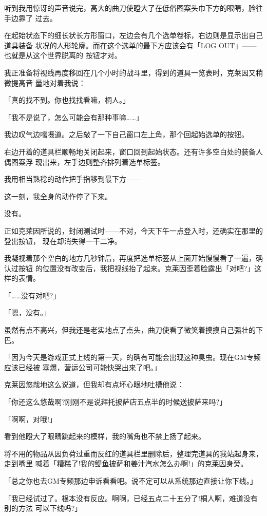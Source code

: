 \documentclass[11pt]{book}
\begin{document}
听到我用惊讶的声音说完，高大的曲刀使瞪大了在低俗图案头巾下方的眼睛，脸往手边靠了
过去。

在起始状态下的细长状长方形窗口，左边会有几个选单卷标，右边则是显示出自己道具装备
状况的人形轮廓。而在这个选单的最下方应该会有「LOG OUT」——也就是从这个世界脱离的
按钮才对。

我正准备将视线再度移回在几个小时的战斗里，得到的道具一览表时，克莱因又稍微提高音
量地对着我说：

「真的找不到。你也找找看嘛，桐人。」

「我不是说了，怎么可能会有那种事嘛……」

我边叹气边嚅嗫道。之后敲了一下自己窗口左上角，那个回起始选单的按钮。

右边开着的道具栏顺畅地关闭起来，窗口回到起始状态。还有许多空白处的装备人偶图案浮
现出来，左手边则整齐排列着选单标签。

我用相当熟稔的动作把手指移到最下方——

这一刻，我全身的动作停了下来。

没有。

正如克莱因所说的，封闭测试时——不对，今天下午一点登入时，还确实在那里的登出按钮，
现在却消失得一干二净。

我凝视着那个空白的地方几秒钟后，再度把选单标签从上面开始慢慢看了一遍，确认过按钮
的位置没有改变后，我把视线抬了起来。克莱因歪着脸露出「对吧?」这样的表情。

「……没有对吧?」

「嗯，没有。」

虽然有点不高兴，但我还是老实地点了点头，曲刀使看了微笑着摸摸自己强壮的下巴。

「因为今天是游戏正式上线的第一天，的确有可能会出现这种臭虫。现在GM专频应该已经被
塞爆，营运公司可能快哭出来了吧。」

克莱因悠哉地这么说道，但我却有点坏心眼地吐槽他说：

「你还这么悠哉啊?刚刚不是说拜托披萨店五点半的时候送披萨来吗?」

「啊啊，对哦!」

看到他瞪大了眼睛跳起来的模样，我的嘴角也不禁上扬了起来。

将不用的物品从因负荷过重而反红的道具栏里删除后，整理完道具的我站起身来，走到嘴里
喊着「糟糕了!我的鳀鱼披萨和姜汁汽水怎么办啊!」的克莱因身旁。

「总之你也去GM专频那边申诉看看吧。说不定可以从系统那边直接让你下线。」

「我已经试过了。根本没有反应。啊啊，已经五点二十五分了!桐人啊，难道没有别的方法
可以下线吗?」
\end{document}
